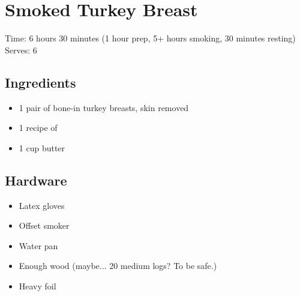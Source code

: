 \section{Smoked Turkey Breast}
\label{smokedTurkeyBreast}
\setcounter{secnumdepth}{0}
Time: 6 hours 30 minutes (1 hour prep, 5+ hours smoking, 30 minutes resting)
Serves: 6

\begin{multicols}{2}
\subsection*{Ingredients}
\begin{itemize}
    \item 1 pair of bone-in turkey breasts, skin removed
    \item 1 recipe of 
    \item 1 cup butter
\end{itemize}

\subsection*{Hardware}
\begin{itemize}
    \item Latex gloves
    \item Offset smoker
    \item Water pan
    \item Enough wood (maybe... 20 medium logs? To be safe.)
    \item Heavy foil
\end{itemize}
\clearpage


\end{multicols}
